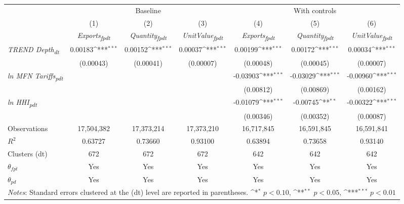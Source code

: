 {
\def\sym#1{\ifmmode^{#1}\else\(^{#1}\)\fi}
\begin{tabular}{l*{6}{c}}
\toprule
&\multicolumn{3}{c}{Baseline}&\multicolumn{3}{c}{With controls}\\\cmidrule(lr){2-4}\cmidrule(lr){5-7}
&(1)&(2)&(3)&(4)&(5)&(6)\\
&\textit{Exports\textsubscript{fpdt}}&\textit{Quantity\textsubscript{fpdt}}&\textit{UnitValue\textsubscript{fpdt}}&\textit{Exports\textsubscript{fpdt}}&\textit{Quantity\textsubscript{fpdt}}&\textit{UnitValue\textsubscript{fpdt}}\\
\midrule
\textit{TREND Depth\textsubscript{dt}} & 0.00183\sym{***} & 0.00152\sym{***} & 0.00037\sym{***} & 0.00199\sym{***} & 0.00172\sym{***} & 0.00034\sym{***}\\
 & (0.00043) & (0.00041) & (0.00007) & (0.00048) & (0.00045) & (0.00007)\\
\addlinespace
\textit{ln MFN Tariffs\textsubscript{pdt}} &  &  &  & -0.03903\sym{***} & -0.03029\sym{***} & -0.00960\sym{***}\\
 &  &  &  & (0.00812) & (0.00869) & (0.00162)\\
\addlinespace
\textit{ln HHI\textsubscript{pdt}} &  &  &  & -0.01079\sym{***} & -0.00745\sym{**} & -0.00322\sym{***}\\
 &  &  &  & (0.00346) & (0.00352) & (0.00087)\\
\midrule
Observations & 17,504,382 & 17,373,214 & 17,373,210 & 16,717,845 & 16,591,845 & 16,591,841\\
$R^{2}$ & 0.63727 & 0.73660 & 0.93100 & 0.63894 & 0.73658 & 0.93140\\
Clusters (dt) & 672 & 672 & 672 & 642 & 642 & 642\\
$\theta_{fpt}$ & Yes & Yes & Yes & Yes & Yes & Yes\\
$\theta_{pd}$ & Yes & Yes & Yes & Yes & Yes & Yes\\
\bottomrule
\multicolumn{7}{l}{\footnotesize \textit{Notes}: Standard errors clustered at the (dt) level are reported in parentheses. \sym{*} \(p<0.10\), \sym{**} \(p<0.05\), \sym{***} \(p<0.01\)}\\
\end{tabular}
}
